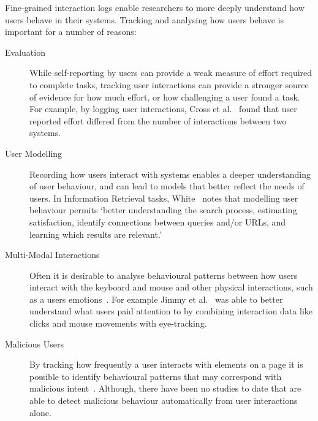 
Fine-grained interaction logs enable researchers to more deeply understand how users behave in their systems. Tracking and analysing how users behave is important for a number of reasons:

\begin{description}
	\item[Evaluation] While self-reporting by users can provide a weak measure of effort required to complete tasks, tracking user interactions can provide a stronger source of evidence for how much effort, or how challenging a user found a task. For example, by logging user interactions, Cross et al.~\cite{cross2021search} found that user reported effort differed from the number of interactions between two systems.
	\item[User Modelling] Recording how users interact with systems enables a deeper understanding of user behaviour, and can lead to models that better reflect the needs of users. In Information Retrieval tasks, White~\cite{white2016interactions} notes that modelling user behaviour permits `better understanding the search process, estimating satisfaction, identify connections between queries and/or URLs, and learning which results are relevant.'
	\item[Multi-Modal Interactions] Often it is desirable to analyse behavioural patterns between how users interact with the keyboard and mouse and other physical interactions, such as a users emotions~\cite{arapakis2008affective}. For example Jimmy et al.~\cite{jimmy2020health} was able to better understand what users paid attention to by combining interaction data like clicks and mouse movements with eye-tracking.
	\item[Malicious Users] By tracking how frequently a user interacts with elements on a page it is possible to identify behavioural patterns that may correspond with malicious intent~\cite{gadiraju2015understanding}. Although, there have been no studies to date that are able to detect malicious behaviour automatically from user interactions alone.
\end{description}